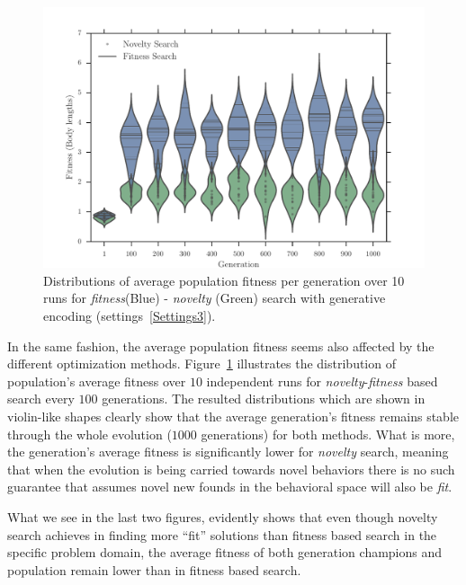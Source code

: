 \begin{figure}[t!]
\centering
\includegraphics[width=1.0\textwidth]{../Figures/Results/ViolinPlotsAvgGenFitSize7.pdf}
\caption{Distributions of average population fitness per generation over 10 runs for \emph{fitness}(Blue) - \emph{novelty} (Green) search with generative encoding (settings~\ref{Settings3}).}
\label{fig:ViolinPlotsAvgGenFitSize7}
\end{figure}

In the same fashion, the average population fitness seems also affected by the different optimization methods. Figure~\ref{fig:ViolinPlotsAvgGenFitSize7} illustrates the distribution of population's average fitness over $10$ independent runs for \emph{novelty}-\emph{fitness} based search every $100$ generations. The resulted distributions which are shown in violin-like shapes clearly show that the average generation's fitness remains stable through the whole evolution ($1000$ generations) for both methods. What is more, the generation's average fitness is significantly lower for \emph{novelty} search, meaning that when the evolution is being carried towards novel behaviors there is no such guarantee that assumes novel new founds in the behavioral space will also be \emph{fit}. 

What we see in the last two figures, evidently shows that even though novelty search achieves in finding more ``fit'' solutions than fitness based search in the specific problem domain, the average fitness of both generation champions and population remain lower than in fitness based search.

